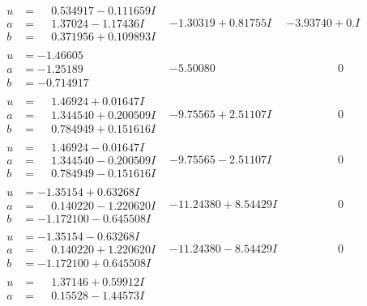 \documentclass[1p]{elsarticle_modified}
\theoremstyle{definition}
\begin{document}
$$\begin{array}{c|c|c}
\begin{aligned}
u &= \phantom{-}0.534917 - 0.111659 I \\
a &= \phantom{-}1.37024 - 1.17436 I \\
b &= \phantom{-}0.371956 + 0.109893 I\end{aligned}
 & -1.30319 + 0.81755 I & -3.93740 + 0. I\phantom{ +0.000000I} \\ \hline\begin{aligned}
u &= -1.46605\phantom{ +0.000000I} \\
a &= -1.25189\phantom{ +0.000000I} \\
b &= -0.714917\phantom{ +0.000000I}\end{aligned}
 & -5.50080\phantom{ +0.000000I} & \phantom{-0.000000 } 0 \\ \hline\begin{aligned}
u &= \phantom{-}1.46924 + 0.01647 I \\
a &= \phantom{-}1.344540 + 0.200509 I \\
b &= \phantom{-}0.784949 + 0.151616 I\end{aligned}
 & -9.75565 + 2.51107 I & \phantom{-0.000000 } 0 \\ \hline\begin{aligned}
u &= \phantom{-}1.46924 - 0.01647 I \\
a &= \phantom{-}1.344540 - 0.200509 I \\
b &= \phantom{-}0.784949 - 0.151616 I\end{aligned}
 & -9.75565 - 2.51107 I & \phantom{-0.000000 } 0 \\ \hline\begin{aligned}
u &= -1.35154 + 0.63268 I \\
a &= \phantom{-}0.140220 - 1.220620 I \\
b &= -1.172100 - 0.645508 I\end{aligned}
 & -11.24380 + 8.54429 I & \phantom{-0.000000 } 0 \\ \hline\begin{aligned}
u &= -1.35154 - 0.63268 I \\
a &= \phantom{-}0.140220 + 1.220620 I \\
b &= -1.172100 + 0.645508 I\end{aligned}
 & -11.24380 - 8.54429 I & \phantom{-0.000000 } 0 \\ \hline\begin{aligned}
u &= \phantom{-}1.37146 + 0.59912 I \\
a &= \phantom{-}0.15528 - 1.44573 I \\

\end{aligned}
\end{array}$$
\end{document}
